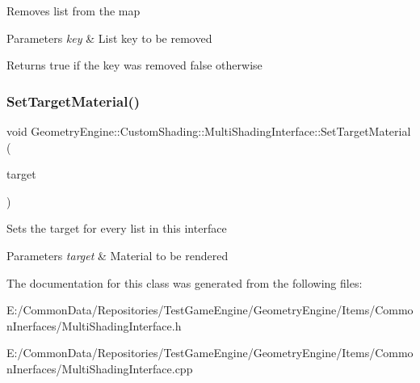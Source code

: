 Removes list from the map 
\begin{DoxyParams}{Parameters}
{\em key} & List key to be removed \\
\hline
\end{DoxyParams}
\begin{DoxyReturn}{Returns}
true if the key was removed false otherwise 
\end{DoxyReturn}
\mbox{\label{class_geometry_engine_1_1_custom_shading_1_1_multi_shading_interface_a01ed5b783765986ca3f7557ae884cf68}} 
\subsubsection{\texorpdfstring{SetTargetMaterial()}{SetTargetMaterial()}}
{\footnotesize\ttfamily void Geometry\+Engine\+::\+Custom\+Shading\+::\+Multi\+Shading\+Interface\+::\+Set\+Target\+Material (\begin{DoxyParamCaption}\item[{\mbox{\hyperlink{class_geometry_engine_1_1_geometry_material_1_1_material}{Geometry\+Material\+::\+Material}} $\ast$}]{target }\end{DoxyParamCaption})}

Sets the target for every list in this interface 
\begin{DoxyParams}{Parameters}
{\em target} & Material to be rendered \\
\hline
\end{DoxyParams}


The documentation for this class was generated from the following files\+:\begin{DoxyCompactItemize}
\item 
E\+:/\+Common\+Data/\+Repositories/\+Test\+Game\+Engine/\+Geometry\+Engine/\+Items/\+Common\+Inerfaces/Multi\+Shading\+Interface.\+h\item 
E\+:/\+Common\+Data/\+Repositories/\+Test\+Game\+Engine/\+Geometry\+Engine/\+Items/\+Common\+Inerfaces/Multi\+Shading\+Interface.\+cpp\end{DoxyCompactItemize}
